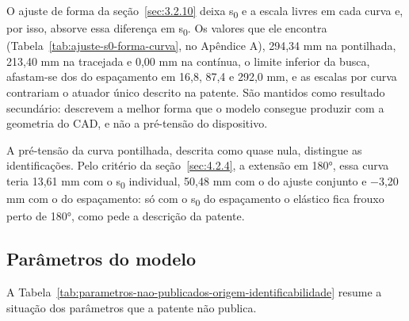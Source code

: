 O ajuste de forma da seção~\ref{sec:3.2.10} deixa s\textsubscript{0} e a escala livres em cada curva e, por isso, absorve essa diferença em s\textsubscript{0}. Os valores que ele encontra (Tabela~\ref{tab:ajuste-s0-forma-curva}, no Apêndice A), 294,34 mm na pontilhada, 213,40 mm na tracejada e 0,00 mm na contínua, o limite inferior da busca, afastam-se dos do espaçamento em 16,8, 87,4 e 292,0 mm, e as escalas por curva contrariam o atuador único descrito na patente. São mantidos como resultado secundário: descrevem a melhor forma que o modelo consegue produzir com a geometria do CAD, e não a pré-tensão do dispositivo.

A pré-tensão da curva pontilhada, descrita como quase nula, distingue as identificações. Pelo critério da seção~\ref{sec:4.2.4}, a extensão em 180°, essa curva teria 13,61 mm com o s\textsubscript{0} individual, 50,48 mm com o do ajuste conjunto e −3,20 mm com o do espaçamento: só com o s\textsubscript{0} do espaçamento o elástico fica frouxo perto de 180°, como pede a descrição da patente.

\subsection{Parâmetros do modelo}\label{sec:4.2.6}

A Tabela~\ref{tab:parametros-nao-publicados-origem-identificabilidade} resume a situação dos parâmetros que a patente não publica.

